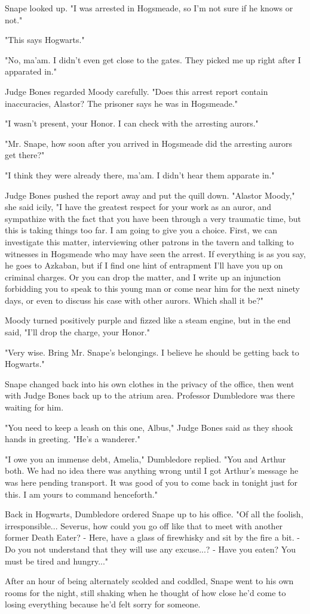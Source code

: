 Snape looked up. "I was arrested in Hogsmeade, so I'm not sure if he knows or not."

"This says Hogwarts."

"No, ma'am. I didn't even get close to the gates. They picked me up right after I apparated in."

Judge Bones regarded Moody carefully. "Does this arrest report contain inaccuracies, Alastor? The prisoner says he was in Hogsmeade."

"I wasn't present, your Honor. I can check with the arresting aurors."

"Mr. Snape, how soon after you arrived in Hogsmeade did the arresting aurors get there?"

"I think they were already there, ma'am. I didn't hear them apparate in."

Judge Bones pushed the report away and put the quill down. "Alastor Moody," she said icily, "I have the greatest respect for your work as an auror, and sympathize with the fact that you have been through a very traumatic time, but this is taking things too far. I am going to give you a choice. First, we can investigate this matter, interviewing other patrons in the tavern and talking to witnesses in Hogsmeade who may have seen the arrest. If everything is as you say, he goes to Azkaban, but if I find one hint of entrapment I'll have you up on criminal charges. Or you can drop the matter, and I write up an injunction forbidding you to speak to this young man or come near him for the next ninety days, or even to discuss his case with other aurors. Which shall it be?"

Moody turned positively purple and fizzed like a steam engine, but in the end said, "I'll drop the charge, your Honor."

"Very wise. Bring Mr. Snape's belongings. I believe he should be getting back to Hogwarts."

Snape changed back into his own clothes in the privacy of the office, then went with Judge Bones back up to the atrium area. Professor Dumbledore was there waiting for him.

"You need to keep a leash on this one, Albus," Judge Bones said as they shook hands in greeting. "He's a wanderer."

"I owe you an immense debt, Amelia," Dumbledore replied. "You and Arthur both. We had no idea there was anything wrong until I got Arthur's message he was here pending transport. It was good of you to come back in tonight just for this. I am yours to command henceforth."

Back in Hogwarts, Dumbledore ordered Snape up to his office. "Of all the foolish, irresponsible... Severus, how could you go off like that to meet with another former Death Eater? - Here, have a glass of firewhisky and sit by the fire a bit. - Do you not understand that they will use any excuse...? - Have you eaten? You must be tired and hungry..."

After an hour of being alternately scolded and coddled, Snape went to his own rooms for the night, still shaking when he thought of how close he'd come to losing everything because he'd felt sorry for someone. 


